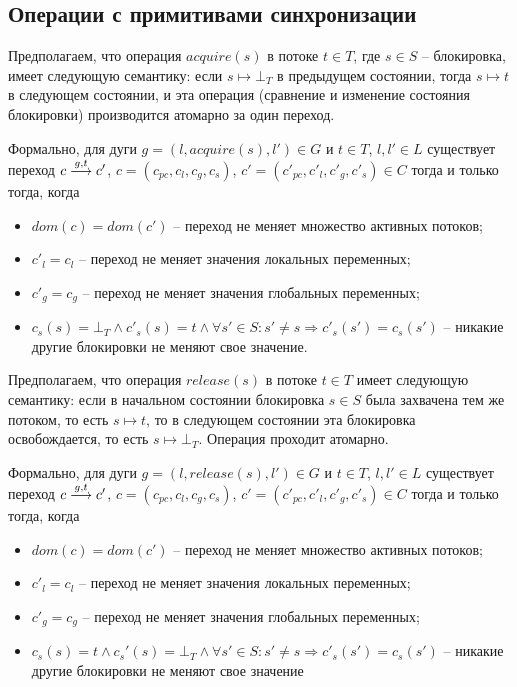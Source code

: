 \subsection{Операции с примитивами синхронизации}

Предполагаем, что операция $acquire(s)$ в потоке $t \in T$, где $s\in S$ -- блокировка, имеет следующую семантику: 
если $s \mapsto \bot_T$ в предыдущем состоянии, тогда $s \mapsto t$ в следующем состоянии, и эта операция (сравнение и изменение состояния блокировки) производится атомарно за один переход.

Формально, для дуги $g = (l, acquire(s), l') \in G$ и $t\in T$, $l, l' \in L$ существует переход
$c \stackrel{g, t}{\longrightarrow} c'$, $c=(c_{pc}, c_l, c_g, c_s)$, $c'=(c'_{pc}, c'_l, c'_g, c'_s) \in C$
тогда и только тогда, когда 
\begin{itemize}
\item $dom(c)=dom(c')$ -- переход не меняет множество активных потоков;
\item $c'_l=c_l$ -- переход не меняет значения локальных переменных;
\item $c'_g = c_g$ -- переход не меняет значения глобальных переменных;
\item $c_s(s) = \bot_T \land c'_s(s)=t \land \forall s'\in S: s'\neq s \Rightarrow c'_s(s')=c_s(s')$ -- никакие другие блокировки не меняют свое значение.
\end{itemize}

Предполагаем, что операция $release(s)$ в потоке $t \in T$ имеет следующую семантику:
если в начальном состоянии блокировка $s \in S$ была захвачена тем же потоком, то есть $s \mapsto t$, то в следующем состоянии эта блокировка освобождается, то есть $s \mapsto \bot_T$. Операция проходит атомарно.

Формально, для дуги $g = (l, release(s), l')\in G$ и $t\in T$, $l, l' \in L$ существует переход
$c \stackrel{g, t}{\longrightarrow} c'$, $c=(c_{pc}, c_l, c_g, c_s)$, $c'=(c'_{pc}, c'_l, c'_g, c'_s) \in C$ тогда и только тогда, когда 
\begin{itemize}
\item $dom(c)=dom(c')$ -- переход не меняет множество активных потоков;
\item $c'_l=c_l$ -- переход не меняет значения локальных переменных;
\item $c'_g = c_g$ -- переход не меняет значения глобальных переменных;
\item $c_s(s)=t \land c_s'(s)=\bot_T \land \forall s'\in S: s'\neq s \Rightarrow c'_s(s')=c_s(s')$ -- никакие другие блокировки не меняют свое значение
\end{itemize}

